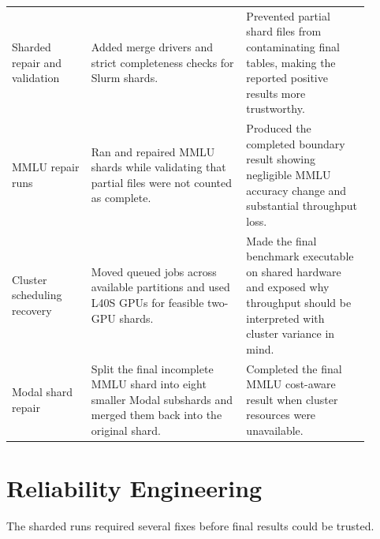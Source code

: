 \documentclass[11pt]{article}
\begin{document}
\begin{longtable}{p{0.20\linewidth}p{0.39\linewidth}p{0.31\linewidth}}
Sharded repair and validation & Added merge drivers and strict completeness checks for Slurm shards. & Prevented partial shard files from contaminating final tables, making the reported positive results more trustworthy. \\
MMLU repair runs & Ran and repaired MMLU shards while validating that partial files were not counted as complete. & Produced the completed boundary result showing negligible MMLU accuracy change and substantial throughput loss. \\
Cluster scheduling recovery & Moved queued jobs across available partitions and used L40S GPUs for feasible two-GPU shards. & Made the final benchmark executable on shared hardware and exposed why throughput should be interpreted with cluster variance in mind. \\
Modal shard repair & Split the final incomplete MMLU shard into eight smaller Modal subshards and merged them back into the original shard. & Completed the final MMLU cost-aware result when cluster resources were unavailable. \\
\bottomrule
\end{longtable}

\section{Reliability Engineering}

The sharded runs required several fixes before final results could be trusted.
\end{document}
